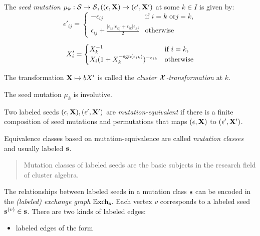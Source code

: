 \begin{definition}\label{def:seedmutation}
    The \textit{seed mutation} $\mu_k: \mathcal{S} \rightarrow \mathcal{S}, ((\epsilon, \mathbf{X}) \mapsto (\epsilon', \mathbf{X}')$ at some $k \in I$ is given by:
    \begin{equation}
        \epsilon'_{ij} = \begin{cases}
            -\epsilon_{ij} & \text{if } i=k \text{ or} j=k,\\
            \epsilon_{ij} + \frac{|\epsilon_{ik}|e_{kj} + \epsilon_{ik}|\epsilon_{kj}}{2} & \text{otherwise}
        \end{cases}
    \end{equation}

    \begin{equation}
        X'_i = \begin{cases}
            X^{-1}_k & \text{if } i=k,\\
            X_i(1+X^{-\text{sgn}(\epsilon_{ik})}_k)^{-\epsilon_{ik}} & \text{otherwise}
        \end{cases}
    \end{equation}

    The transformation $\mathbf{X} \mapsto bX'$ is called the \textit{cluster $\mathbf{\mathcal{X}}$-transformation} at $k$.

    The seed mutation $\mu_k$ is involutive.
\end{definition}

\begin{definition}\label{def:mutation-equivalence}
    Two labeled seeds $(\epsilon, \mathbf{X}), (\epsilon', \mathbf{X}')$ are \textit{mutation-equivalent} if there is a finite composition of seed mutations and permutations that maps $(\epsilon, \mathbf{X})$ to $(\epsilon', \mathbf{X}')$.

    Equivalence classes based on mutation-equivalence are called \textit{mutation classes} and usually labeled $\mathbf{s}$.

    \begin{quote}
        Mutation classes of labeled seeds are the basic subjects in the research field of cluster algebra.\cite{aik023earthquake}
    \end{quote}
\end{definition}

\begin{definition}
    The relationships between labeled seeds in a mutation class $\mathbf{s}$ can be encoded in the \textit{(labeled) exchange graph} $\mathbb{E}\text{xch}_{\mathbf{s}}$. Each vertex $v$ corresponds to a labeled seed $\mathbf{s}^{(v)} \in \mathbf{s}$. There are two kinds of labeled edges:
    \begin{itemize}
        \item labeled edges of the form
    \end{itemize}
\end{definition}